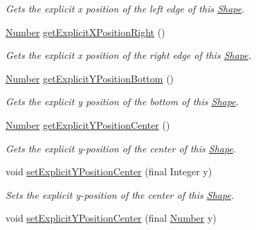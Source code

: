 \begin{DoxyCompactItemize}
\begin{DoxyCompactList}\small\item\em Gets the explicit x position of the left edge of this \hyperlink{classcom_1_1aarrelaakso_1_1drawl_1_1_shape}{Shape}. \end{DoxyCompactList}\item 
\hyperlink{interfacecom_1_1aarrelaakso_1_1drawl_1_1_number}{Number} \hyperlink{classcom_1_1aarrelaakso_1_1drawl_1_1_shape_a86920ba43a76d5a02977e5f9ea3509ac}{get\+Explicit\+X\+Position\+Right} ()
\begin{DoxyCompactList}\small\item\em Gets the explicit x position of the right edge of this \hyperlink{classcom_1_1aarrelaakso_1_1drawl_1_1_shape}{Shape}. \end{DoxyCompactList}\item 
\hyperlink{interfacecom_1_1aarrelaakso_1_1drawl_1_1_number}{Number} \hyperlink{classcom_1_1aarrelaakso_1_1drawl_1_1_shape_a28b8e03381be6afdc7c5c8da48c80afe}{get\+Explicit\+Y\+Position\+Bottom} ()
\begin{DoxyCompactList}\small\item\em Gets the explicit y position of the bottom of this \hyperlink{classcom_1_1aarrelaakso_1_1drawl_1_1_shape}{Shape}. \end{DoxyCompactList}\item 
\hyperlink{interfacecom_1_1aarrelaakso_1_1drawl_1_1_number}{Number} \hyperlink{classcom_1_1aarrelaakso_1_1drawl_1_1_shape_a1e46cc626d5f5e1360d9d35d23cc50ea}{get\+Explicit\+Y\+Position\+Center} ()
\begin{DoxyCompactList}\small\item\em Gets the explicit y-\/position of the center of this \hyperlink{classcom_1_1aarrelaakso_1_1drawl_1_1_shape}{Shape}. \end{DoxyCompactList}\item 
void \hyperlink{classcom_1_1aarrelaakso_1_1drawl_1_1_shape_a93e9e1bdd05f111661660e9de621cd12}{set\+Explicit\+Y\+Position\+Center} (final Integer y)
\begin{DoxyCompactList}\small\item\em Sets the explicit y-\/position of the center of this \hyperlink{classcom_1_1aarrelaakso_1_1drawl_1_1_shape}{Shape}. \end{DoxyCompactList}\item 
void \hyperlink{classcom_1_1aarrelaakso_1_1drawl_1_1_shape_a7d49d69bd74e57c3a3341a025c3cce50}{set\+Explicit\+Y\+Position\+Center} (final \hyperlink{interfacecom_1_1aarrelaakso_1_1drawl_1_1_number}{Number} y)

\end{DoxyCompactItemize}
